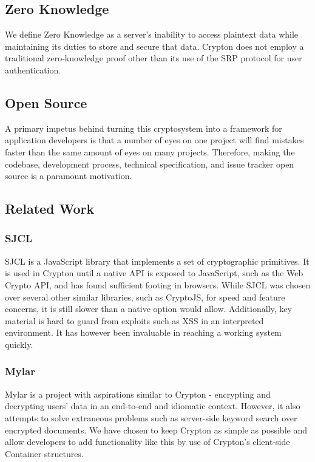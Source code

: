 \documentclass[conference]{IEEEtran}
\begin{document}
\subsection{Zero Knowledge}
We define Zero Knowledge as a server's inability to access plaintext data while
maintaining its duties to store and secure that data. Crypton does not employ a
traditional zero-knowledge proof other than its use of the SRP\cite{SRP}
protocol for user authentication.

\subsection{Open Source}
A primary impetus behind turning this cryptosystem into a framework for
application developers is that a number of eyes on one project will find mistakes
faster than the same amount of eyes on many projects. Therefore,
making the codebase, development process, technical specification,
and issue tracker open source is a paramount motivation.

\subsection{Related Work}

\subsubsection{SJCL}
SJCL is a JavaScript library that implements a set of cryptographic 
primitives\cite{sjcl}. It is used in Crypton until a native API is exposed to JavaScript,
such as the Web Crypto API, and has found sufficient footing in browsers.
While SJCL was chosen over several other similar libraries, such as
CryptoJS\cite{cryptojs}, for speed and feature concerns,
it is still slower than a native option would allow. Additionally,
key material is hard to guard from exploits such as XSS in an interpreted
environment. It has however been invaluable in reaching a working system quickly.

\subsubsection{Mylar}
Mylar\cite{mylar} is a project with aspirations similar to
Crypton - encrypting and decrypting users' data in an end-to-end and idiomatic context.
However, it also attempts\cite{mylarpaper} to solve extraneous problems
such as server-side keyword search over encrypted documents.
We have chosen to keep Crypton as simple as possible and allow developers to add
functionality like this by use of Crypton's client-side Container structures.
\end{document}
